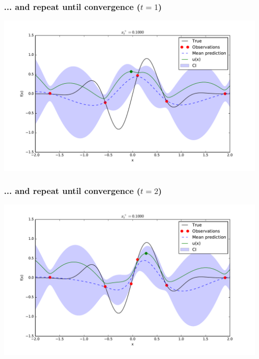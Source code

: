 \documentclass{beamer}
\begin{document}
\begin{frame}
    \frametitle{... and repeat until convergence ($t=1$)}
    \begin{center}
        \includegraphics[width=\textwidth]{code/fig4-1.pdf}
    \end{center}
\end{frame}

\begin{frame}
    \frametitle{... and repeat until convergence ($t=2$)}
    \begin{center}
        \includegraphics[width=\textwidth]{code/fig4-2.pdf}
    \end{center}
\end{frame}
\end{document}
